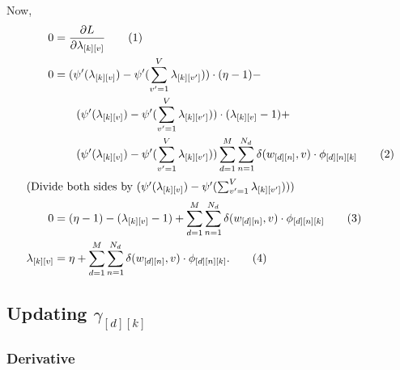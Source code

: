 \documentclass[12pt]{article}
\newcommand\numberthis{\addtocounter{equation}{1}\tag{\theequation}}
\begin{document}
Now,
\begin{align*}
    0 &= \frac{\partial L}{\partial \lambda_{[k][v]}}
    \numberthis\\
    0 &=
    (\psi'(\lambda_{[k][v]}) - \psi'(\sum_{v'=1}^{V}
    \lambda_{[k][v']})) \cdot (\eta - 1) -
    \\* &\quad\quad (\psi'(\lambda_{[k][v]}) -
    \psi'(\sum_{v'=1}^{V} \lambda_{[k][v']})) \cdot (\lambda_{[k][v]} - 1) +
    \\* & \quad\quad (\psi'(\lambda_{[k][v]}) -
    \psi'(\sum_{v'=1}^{V}\lambda_{[k][v']})) \sum_{d=1}^{M} \sum_{n=1}^{N_{d}}
    \delta(w_{[d][n]},v) \cdot \phi_{[d][n][k]}
    \numberthis\\
    \intertext{(Divide both sides by $(\psi'(\lambda_{[k][v]}) -
    \psi'(\sum_{v'=1}^{V} \lambda_{[k][v']}))$)}
    0 &= (\eta - 1) - (\lambda_{[k][v]} - 1) + \sum_{d=1}^{M} \sum_{n=1}^{N_{d}}
    \delta(w_{[d][n]}, v)\cdot\phi_{[d][n][k]}
    \numberthis\\
    \lambda_{[k][v]} &= \eta + \sum_{d=1}^{M} \sum_{n=1}^{N_{d}}
    \delta(w_{[d][n]}, v)\cdot\phi_{[d][n][k]}.
    \numberthis\label{eq:lambdaupdate}
\end{align*}

\subsection{Updating $\gamma_{[d][k]}$}

\subsubsection{Derivative}
\end{document}
